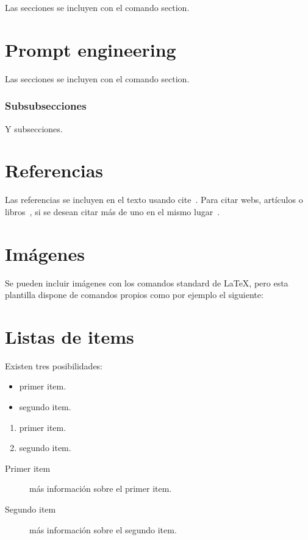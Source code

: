 Las secciones se incluyen con el comando section.

\section{Prompt engineering}

Las secciones se incluyen con el comando section.

\subsubsection{Subsubsecciones}

Y subsecciones. 


\section{Referencias}

Las referencias se incluyen en el texto usando cite~\cite{wiki:latex}. Para citar webs, artículos o libros~\cite{koza92}, si se desean citar más de uno en el mismo lugar~\cite{bortolot2005, koza92}.


\section{Imágenes}

Se pueden incluir imágenes con los comandos standard de \LaTeX, pero esta plantilla dispone de comandos propios como por ejemplo el siguiente:




\section{Listas de items}

Existen tres posibilidades:

\begin{itemize}
	\item primer item.
	\item segundo item.
\end{itemize}

\begin{enumerate}
	\item primer item.
	\item segundo item.
\end{enumerate}

\begin{description}
	\item[Primer item] más información sobre el primer item.
	\item[Segundo item] más información sobre el segundo item.
\end{description}
	
